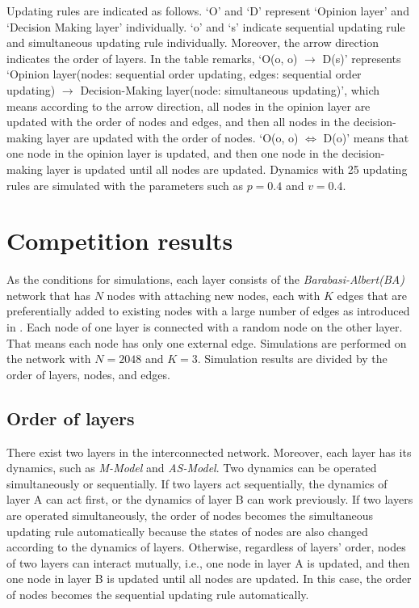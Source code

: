 Updating rules are indicated as follows. `O' and `D'  represent `Opinion layer' and `Decision Making layer' individually. `o' and `s' indicate sequential updating rule and simultaneous updating rule individually. Moreover, the arrow direction indicates the order of layers. In the table remarks, `O(o, o) $\to$ D(s)' represents `Opinion layer(nodes: sequential order updating, edges: sequential order updating) $\to$ Decision-Making layer(node: simultaneous updating)', which means according to the arrow direction, all nodes in the opinion layer are updated with the order of nodes and edges, and then all nodes in the decision-making layer are updated with the order of nodes. `O(o, o) $\Leftrightarrow$ D(o)' means that one node in the opinion layer is updated, and then one node in the decision-making layer is updated until all nodes are updated. Dynamics with 25 updating rules are simulated with the parameters such as $p=0.4$ and $v=0.4$. \\

\section{Competition results}
As the conditions for simulations, each layer consists of the \textit{Barabasi-Albert(BA)} network that has $N$ nodes with attaching new nodes, each with $K$ edges that are preferentially added to existing nodes with a large number of edges as introduced in \parencite{barabasi1999}. Each node of one layer is connected with a random node on the other layer. That means each node has only one external edge. Simulations are performed on the network with $N=2048$ and $K=3$. Simulation results are divided by the order of layers, nodes, and edges.\\

\subsection{Order of layers}
\label{order of layer}
There exist two layers in the interconnected network. Moreover, each layer has its dynamics, such as \textit{M-Model} and \textit{AS-Model}. Two dynamics can be operated simultaneously or sequentially. If two layers act sequentially, the dynamics of layer A can act first, or the dynamics of layer B can work previously. If two layers are operated simultaneously, the order of nodes becomes the simultaneous updating rule automatically because the states of nodes are also changed according to the dynamics of layers. Otherwise, regardless of layers' order, nodes of two layers can interact mutually, i.e., one node in layer A is updated, and then one node in layer B is updated until all nodes are updated. In this case, the order of nodes becomes the sequential updating rule automatically.

